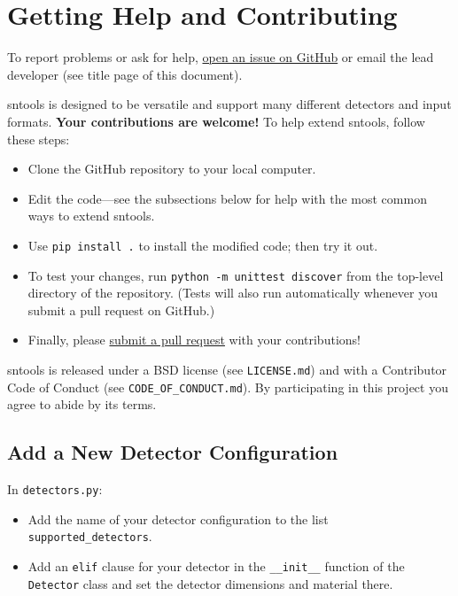 \documentclass[11pt, oneside]{article}
\begin{document}
\section{Getting Help and Contributing}

To report problems or ask for help, \href{https://github.com/JostMigenda/sntools/issues}{open an issue on GitHub} or email the lead developer (see title page of this document).

sntools is designed to be versatile and support many different detectors and input formats.
\textbf{Your contributions are welcome!}
To help extend sntools, follow these steps:

\begin{itemize}
	\item Clone the GitHub repository to your local computer.
	\item Edit the code---see the subsections below for help with the most common ways to extend sntools.
	\item Use \texttt{pip install .} to install the modified code; then try it out.
	\item To test your changes, run \texttt{python -m unittest discover} from the top-level directory of the repository. (Tests will also run automatically whenever you submit a pull request on GitHub.)
	\item Finally, please \href{https://docs.github.com/en/github/collaborating-with-issues-and-pull-requests/about-pull-requests}{submit a pull request} with your contributions!
\end{itemize}

sntools is released under a BSD license (see \texttt{LICENSE.md}) and with a Contributor Code of Conduct (see \texttt{CODE\_OF\_CONDUCT.md}).
By participating in this project you agree to abide by its terms.


\subsection{Add a New Detector Configuration}\label{sec:new-detector-config}

In \texttt{detectors.py}:
\begin{itemize}
\item Add the name of your detector configuration to the list \texttt{supported\_detectors}.
\item Add an \texttt{elif} clause for your detector in the \texttt{\_\_init\_\_} function of the \texttt{Detector} class and set the detector dimensions and material there.
\end{itemize}
\end{document}
